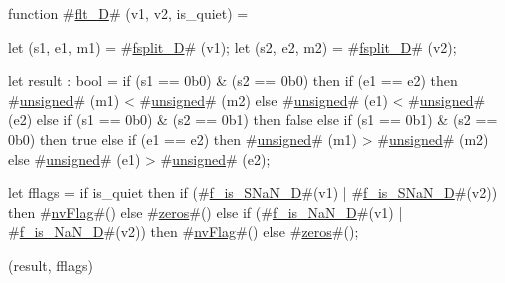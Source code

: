 function #\hyperref[sailRISCVzfltzyD]{flt\_D}#   (v1,       v2,        is_quiet) = {
  let (s1, e1, m1) = #\hyperref[sailRISCVzfsplitzyD]{fsplit\_D}# (v1);
  let (s2, e2, m2) = #\hyperref[sailRISCVzfsplitzyD]{fsplit\_D}# (v2);

  let result : bool =
    if (s1 == 0b0) & (s2 == 0b0) then
      if   (e1 == e2)
      then #\hyperref[sailRISCVzunsigned]{unsigned}# (m1) < #\hyperref[sailRISCVzunsigned]{unsigned}# (m2)
      else #\hyperref[sailRISCVzunsigned]{unsigned}# (e1) < #\hyperref[sailRISCVzunsigned]{unsigned}# (e2)
    else if (s1 == 0b0) & (s2 == 0b1) then
      false
    else if (s1 == 0b1) & (s2 == 0b0) then
      true
    else
      if   (e1 == e2)
      then #\hyperref[sailRISCVzunsigned]{unsigned}# (m1) > #\hyperref[sailRISCVzunsigned]{unsigned}# (m2)
      else #\hyperref[sailRISCVzunsigned]{unsigned}# (e1) > #\hyperref[sailRISCVzunsigned]{unsigned}# (e2);

  let fflags = if is_quiet then
                 if   (#\hyperref[sailRISCVzfzyiszySNaNzyD]{f\_is\_SNaN\_D}#(v1) | #\hyperref[sailRISCVzfzyiszySNaNzyD]{f\_is\_SNaN\_D}#(v2))
                 then #\hyperref[sailRISCVznvFlag]{nvFlag}#()
                 else #\hyperref[sailRISCVzzzeros]{zeros}#()
               else
                 if   (#\hyperref[sailRISCVzfzyiszyNaNzyD]{f\_is\_NaN\_D}#(v1) | #\hyperref[sailRISCVzfzyiszyNaNzyD]{f\_is\_NaN\_D}#(v2))
                 then #\hyperref[sailRISCVznvFlag]{nvFlag}#()
                 else #\hyperref[sailRISCVzzzeros]{zeros}#();

  (result, fflags)
}
